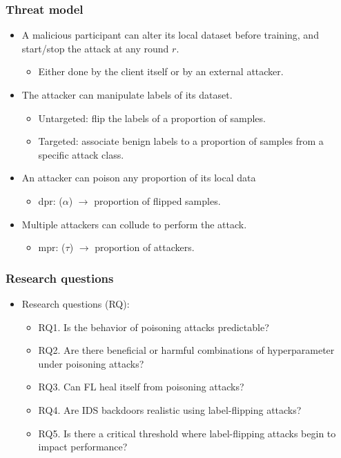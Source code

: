 \documentclass[color,t,presentation,english,aspectratio=169]{beamer}
\begin{document}
\begin{frame}
	\frametitle{Threat model}

	\begin{itemize}
			\item<1-> A malicious participant can alter its local dataset before training, and start/stop the attack at any round $r$.
			\begin{itemize}
				\item Either done by the client itself or by an external attacker.
			\end{itemize}
			\item<2-> The attacker can manipulate labels of its dataset.
			\begin{itemize}
				\item Untargeted: flip the labels of a proportion of samples.
				\item Targeted: associate benign labels to a proportion of samples from a specific attack class.
			\end{itemize}
			\item<3-> An attacker can poison any proportion of its local data
			\begin{itemize}
				\item \Acrfull{dpr}: ($\alpha$) $\rightarrow$ proportion of flipped samples.
			\end{itemize}
			\item<4-> Multiple attackers can collude to perform the attack.
			\begin{itemize}
				\item \Acrfull{mpr}: ($\tau$) $\rightarrow$ proportion of attackers.
			\end{itemize}
	\end{itemize}
\end{frame}

\begin{frame}
	\frametitle{Research questions}
	\begin{itemize}
		\item Research questions (RQ):
    \begin{itemize}
			\item RQ1. Is the behavior of poisoning attacks predictable?
			\item RQ2. Are there beneficial or harmful combinations of hyperparameter under poisoning attacks?
			\item RQ3. Can FL heal itself from poisoning attacks?
			\item RQ4. Are IDS backdoors realistic using label-flipping attacks?
			\item RQ5. Is there a critical threshold where label-flipping attacks begin to impact performance?
    \end{itemize}
	\end{itemize}
\end{frame}
\end{document}
